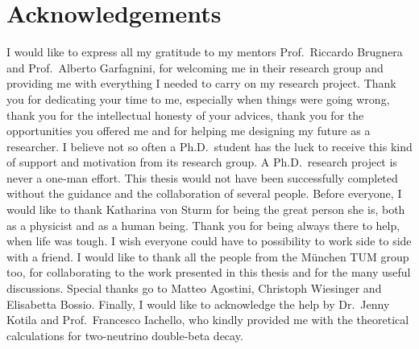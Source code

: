 
\chapter*{Acknowledgements}

I would like to express all my gratitude to my mentors Prof.~Riccardo Brugnera and
Prof.~Alberto Garfagnini, for welcoming me in their research group and providing me with
everything I needed to carry on my research project. Thank you for dedicating your time to
me, especially when things were going wrong, thank you for the intellectual honesty of
your advices, thank you for the opportunities you offered me and for helping me designing
my future as a researcher. I believe not so often a Ph.D.~student has the luck to receive
this kind of support and motivation from its research group.
\newpar
A Ph.D.~research project is never a one-man effort. This thesis would not have been
successfully completed without the guidance and the collaboration of several people.
Before everyone, I would like to thank Katharina von Sturm for being the great person she
is, both as a physicist and as a human being. Thank you for being always there to help,
when life was tough. I wish everyone could have to possibility to work side to side with a
friend. I would like to thank all the people from the M\"unchen TUM group too, for
collaborating to the work presented in this thesis and for the many useful discussions.
Special thanks go to Matteo Agostini, Christoph Wiesinger and Elisabetta Bossio.
\newpar
Finally, I would like to acknowledge the help by Dr.~Jenny Kotila and Prof.~Francesco
Iachello, who kindly provided me with the theoretical calculations for two-neutrino
double-beta decay.

\chapendgliph{}

